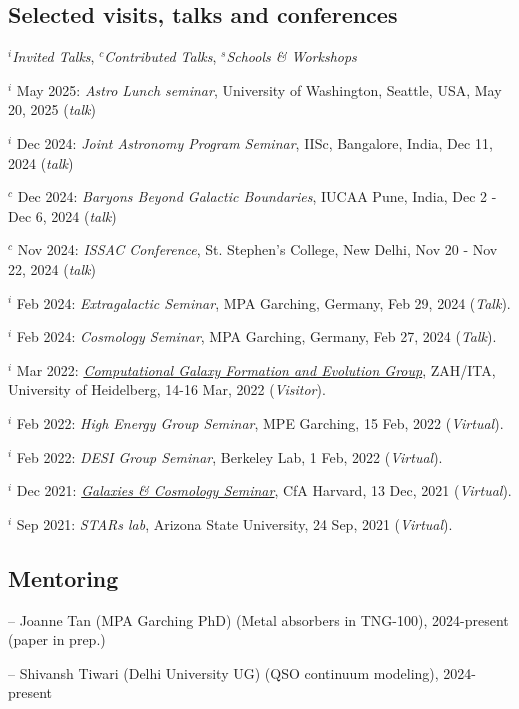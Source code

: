 \documentclass[12pt,letterpaper]{article}
\begin{document}
\subsection{Selected visits, talks and conferences}
\vspace{-1mm}
$^i$\emph{Invited Talks}, $^c$\emph{Contributed Talks}, $^s$\emph{Schools \& Workshops}
\begin{list}{}{\cvlist}
\item $^i$ May 2025:  \emph{Astro Lunch seminar}, University of Washington, Seattle, USA, May 20, 2025 (\textit{talk})
\item $^i$ Dec 2024:  \emph{Joint Astronomy Program Seminar}, IISc, Bangalore, India, Dec 11, 2024 (\textit{talk})
\item $^c$ Dec 2024:  \emph{Baryons Beyond Galactic Boundaries}, IUCAA Pune, India, Dec 2 - Dec 6, 2024 (\textit{talk})
\item $^c$ Nov 2024:  \emph{ISSAC Conference}, St. Stephen's College, New Delhi, Nov 20 - Nov 22, 2024 (\textit{talk})
\item $^i$ Feb 2024:  \emph{Extragalactic Seminar}, MPA Garching, Germany, Feb 29, 2024 (\textit{Talk}).
\item $^i$ Feb 2024:  \emph{Cosmology Seminar}, MPA Garching, Germany, Feb 27, 2024 (\textit{Talk}).
\item $^i$ Mar 2022:  \emph{\href{https://zah.uni-heidelberg.de/research-groups\#c2659}{Computational Galaxy Formation and Evolution Group}}, ZAH/ITA, University of Heidelberg, 14-16 Mar, 2022 (\textit{Visitor}).
\item $^i$ Feb 2022:  \emph{High Energy Group Seminar}, MPE Garching, 15 Feb, 2022 (\textit{Virtual}).
\item $^i$ Feb 2022:  \emph{DESI Group Seminar}, Berkeley Lab, 1 Feb, 2022 (\textit{Virtual}).
\item $^i$ Dec 2021:  \emph{\href{https://pweb.cfa.harvard.edu/calendar/event/9298}{Galaxies \& Cosmology Seminar}}, CfA Harvard, 13 Dec, 2021 (\textit{Virtual}).
\item $^i$ Sep 2021:  \textit{STARs lab}, Arizona State University, 24 Sep, 2021 (\textit{Virtual}).
\end{list}
\vspace{-1.5mm}
\subsection{Mentoring}
  \vspace{-1mm}
\begin{list}{}{\cvlist}
\item -- Joanne Tan (MPA Garching PhD) (Metal absorbers in TNG-100), 2024-present (paper in prep.)
\item -- Shivansh Tiwari (Delhi University UG) (QSO continuum modeling), 2024-present
\end{list}
  \vspace{-2mm}
\end{document}
